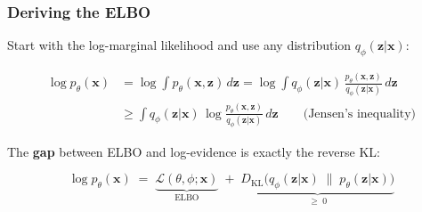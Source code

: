 \documentclass[aspectratio=169]{beamer}
\begin{document}
\begin{frame}
\frametitle{Deriving the ELBO}

\small
Start with the log-marginal likelihood and use any distribution $q_\phi(\mathbf{z}|\mathbf{x})$:

\vspace{-0.2cm}
\begin{align*}
  \log p_\theta(\mathbf{x}) &= \log \int p_\theta(\mathbf{x}, \mathbf{z})\, d\mathbf{z}
  = \log \int q_\phi(\mathbf{z}|\mathbf{x})\,\frac{p_\theta(\mathbf{x}, \mathbf{z})}{q_\phi(\mathbf{z}|\mathbf{x})}\, d\mathbf{z}\\[4pt]
  &\geq \int q_\phi(\mathbf{z}|\mathbf{x})\,\log\frac{p_\theta(\mathbf{x}, \mathbf{z})}{q_\phi(\mathbf{z}|\mathbf{x})}\, d\mathbf{z}
  \qquad\text{(Jensen's inequality)}
\end{align*}

\pause
\vspace{-0.2cm}
\begin{center}
\end{center}

\vspace{0.15cm}
The \textbf{gap} between ELBO and log-evidence is exactly the reverse KL:

$$\boxed{\log p_\theta(\mathbf{x}) \;=\; \underbrace{\mathcal{L}(\theta, \phi; \mathbf{x})}_{\text{ELBO}} \;+\; \underbrace{D_{\text{KL}}\!\big(q_\phi(\mathbf{z}|\mathbf{x}) \;\|\; p_\theta(\mathbf{z}|\mathbf{x})\big)}_{\geq\; 0}}$$
\end{frame}
\end{document}
